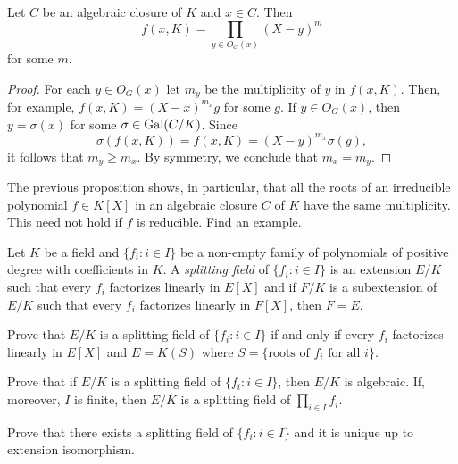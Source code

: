 \begin{proposition}
    Let $C$ be an algebraic closure of $K$ and $x\in C$. Then 
    \[
    f(x,K)=\prod_{y\in O_G(x)}(X-y)^m
    \]
    for some $m$. 
\end{proposition}

\begin{proof}
    For each $y\in O_G(x)$ let $m_y$ be the multiplicity
    of $y$ in $f(x,K)$. 
    Then, for example,
    $f(x,K)=(X-x)^{m_x}g$ for some $g$. If $y\in O_G(x)$, 
    then $y=\sigma(x)$ for some $\sigma\in\operatorname{Gal}(C/K)$. Since
    \[
    \overline{\sigma}(f(x,K))=f(x,K)=(X-y)^{m_x}\overline{\sigma}(g), 
    \]
    it follows that $m_y\geq m_x$. By symmetry, 
    we conclude that $m_x=m_y$. 
\end{proof}

The previous proposition shows, in particular, 
that all the roots of 
an irreducible polynomial $f\in K[X]$ 
in an algebraic closure $C$ of $K$
have the same multiplicity. 
This need not hold if $f$ is reducible.
Find an example.

\begin{definition}
    Let $K$ be a field and $\{f_i:i\in I\}$ be a non-empty 
    family of polynomials of positive degree
    with coefficients in $K$. A \emph{splitting field} 
    of $\{f_i:i\in I\}$ is an extension $E/K$
    such that every $f_i$ factorizes linearly in $E[X]$ and 
    if $F/K$ is a subextension of $E/K$ such that every $f_i$ 
    factorizes linearly in $F[X]$, then $F=E$. 
\end{definition}

\begin{exercise}
    Prove that $E/K$ is a splitting field of
    $\{f_i:i\in I\}$ if and only if every $f_i$ factorizes linearly 
    in $E[X]$ and $E=K(S)$ where $S=\{\text{roots of $f_i$ for all $i$}\}$. 
\end{exercise}

\begin{exercise}
    Prove that if $E/K$ is a splitting field
    of $\{f_i:i\in I\}$, then $E/K$ is algebraic. If, moreover, 
    $I$ is finite, then $E/K$ is a splitting field
    of $\prod_{i\in I}f_i$. 
\end{exercise}

\begin{exercise}
    Prove that 
    there exists a splitting field of $\{f_i:i\in I\}$ 
    and it is unique up to extension isomorphism. 
\end{exercise}

